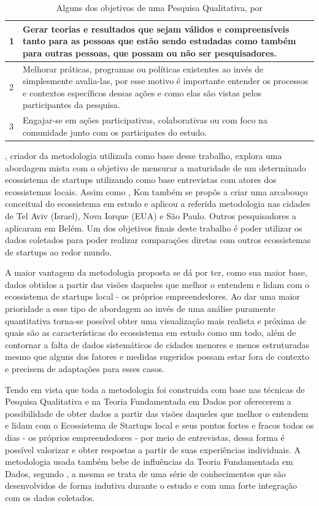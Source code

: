 \begin{table}[!htb]
	\centering
	\begin{tabular}{ | p{3cm} | p{12cm} | }
		\hline
		1 & Gerar teorias e resultados que sejam válidos e compreensíveis tanto para as pessoas que estão sendo estudadas como também para outras pessoas, que possam ou não ser pesquisadores. \\ \hline
		2 & Melhorar práticas, programas ou políticas existentes ao invés de simplesmente avalia-las, por esse motivo é importante entender os processos e contextos específicos dessas ações e como elas são vistas pelos participantes da pesquisa. \\ \hline
		3 & Engajar-se em ações participativas, colaborativas ou com foco na comunidade junto com os participates do estudo. \\ \hline
	\end{tabular}
	\caption{Alguns dos objetivos de uma Pesquisa Qualitativa, por \cite{Maxwell2013}}
	\label{table:pontos_fortes_segundo_maxwell}
\end{table}

, criador da metodologia utilizada como base desse trabalho, explora uma abordagem mista com o objetivo de mensurar a maturidade de um determinado ecossistema de startups utilizando como base entrevistas com atores dos ecossistemas locais. Assim como , Kon também se propôs a criar uma arcabouço conceitual do ecossistema em estudo e aplicou a referida metodologia nas cidades de Tel Aviv (Israel), Nova Iorque (EUA) e São Paulo. Outros pesquisadores a aplicaram em Belém. Um dos objetivos finais deste trabalho é poder utilizar os dados coletados para poder realizar comparações diretas com outros ecossistemas de startups ao redor mundo.

A maior vantagem da metodologia proposta se dá por ter, como sua maior base, dados obtidos a partir das visões daqueles que melhor o entendem e lidam com o ecossistema de startups local - os próprios empreendedores. Ao dar uma maior prioridade a esse tipo de abordagem ao invés de uma análise puramente quantitativa torna-se possível obter uma visualização mais realista e próxima de quais são as características do ecossistema em estudo como um todo, além de contornar a falta de dados sistemáticos de cidades menores e menos estruturadas mesmo que alguns dos fatores e medidas sugeridos possam estar fora de contexto e precisem de adaptações para esses casos.

Tendo em vista que toda a metodologia foi construida com base nas técnicas de Pesquisa Qualitativa e na Teoria Fundamentada em Dados por oferecerem a possibilidade de obter dados a partir das visões daqueles que melhor o entendem e lidam com o Ecossistema de Startups local e seus pontos fortes e fracos todos os dias - os próprios empreendedores - por meio de entrevistas, dessa forma é possível valorizar e obter respostas a partir de suas experiências individuais. A metodologia usada também bebe de influências da Teoria Fundamentada em Dados, segundo , a mesma se trata de uma série de conhecimentos que são desenvolvidos de forma indutiva durante o estudo e com uma forte integração com os dados coletados. 

